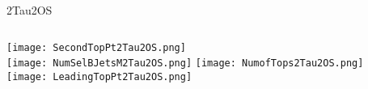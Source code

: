 \documentclass{beamer}
\begin{document}
\begin{frame}{2Tau2OS}
    \begin{columns}[t]
    \centering
    \texttt{[image: SecondTopPt2Tau2OS.png]}\\
    \texttt{[image: NumSelBJetsM2Tau2OS.png]}
    \centering
    \texttt{[image: NumofTops2Tau2OS.png]}\\
    \texttt{[image: LeadingTopPt2Tau2OS.png]}
    \end{columns}
\end{frame}
\end{document}
